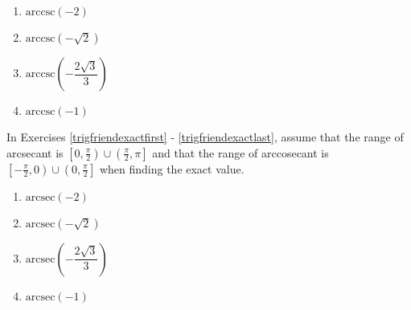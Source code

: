 \begin{multicols}{4}

\begin{enumerate}

\setcounter{enumi}{\value{HW}}

\item $\mbox{arccsc} \left( -2 \right)$  
\item $\mbox{arccsc} \left( -\sqrt{2} \right)$  
\item $\mbox{arccsc} \left( -\dfrac{2\sqrt{3}}{3} \right)$ 
\item $\mbox{arccsc} \left( -1 \right)$   \label{calcfriendexactlast}

\setcounter{HW}{\value{enumi}}

\end{enumerate}

\end{multicols}

\pagebreak

In Exercises \ref{trigfriendexactfirst} - \ref{trigfriendexactlast}, assume that the range of arcsecant is $\left[0, \frac{\pi}{2} \right) \cup \left( \frac{\pi}{2}, \pi \right]$ and that the range of arccosecant is
$\left[ -\frac{\pi}{2}, 0 \right)  \cup \left(0, \frac{\pi}{2} \right]$ when finding the exact value.

\begin{multicols}{4} 

\begin{enumerate}

\setcounter{enumi}{\value{HW}}

\item $\mbox{arcsec} \left( -2 \right)$  \label{trigfriendexactfirst}
\item $\mbox{arcsec} \left( -\sqrt{2} \right)$  
\item $\mbox{arcsec} \left( -\dfrac{2\sqrt{3}}{3} \right)$
\item $\mbox{arcsec} \left( -1 \right)$  

\setcounter{HW}{\value{enumi}}

\end{enumerate}

\end{multicols}

